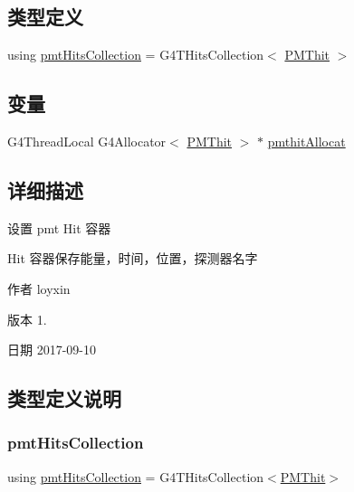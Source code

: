 \subsection*{类型定义}
\begin{DoxyCompactItemize}
\item 
using \hyperlink{PMThit_8hh_a7f735d1ad0bfe8c6aa451ac6d58ffa57}{pmt\+Hits\+Collection} = G4\+T\+Hits\+Collection$<$ \hyperlink{classPMThit}{P\+M\+Thit} $>$
\end{DoxyCompactItemize}
\subsection*{变量}
\begin{DoxyCompactItemize}
\item 
G4\+Thread\+Local G4\+Allocator$<$ \hyperlink{classPMThit}{P\+M\+Thit} $>$ $\ast$ \hyperlink{PMThit_8hh_a71f7d386761191d5c1d7f380ac9abd52}{pmthit\+Allocat}
\end{DoxyCompactItemize}


\subsection{详细描述}
设置 pmt Hit 容器 

Hit 容器保存能量，时间，位置，探测器名字 \begin{DoxyAuthor}{作者}
loyxin 
\end{DoxyAuthor}
\begin{DoxyVersion}{版本}
1. 
\end{DoxyVersion}
\begin{DoxyDate}{日期}
2017-\/09-\/10 
\end{DoxyDate}


\subsection{类型定义说明}
\mbox{\label{PMThit_8hh_a7f735d1ad0bfe8c6aa451ac6d58ffa57}} 
\subsubsection{\texorpdfstring{pmt\+Hits\+Collection}{pmtHitsCollection}}
{\footnotesize\ttfamily using \hyperlink{PMThit_8hh_a7f735d1ad0bfe8c6aa451ac6d58ffa57}{pmt\+Hits\+Collection} =  G4\+T\+Hits\+Collection$<$\hyperlink{classPMThit}{P\+M\+Thit}$>$}



